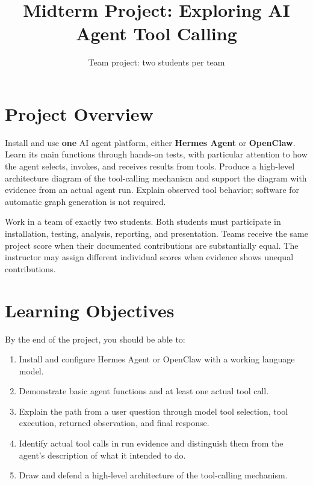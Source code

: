 \documentclass[11pt]{article}
\title{Midterm Project: Exploring AI Agent Tool Calling}
\author{Team project: two students per team}
\date{}
\begin{document}
\maketitle

\section{Project Overview}
Install and use \textbf{one} AI agent platform, either \textbf{Hermes Agent} or \textbf{OpenClaw}. Learn its main functions through hands-on tests, with particular attention to how the agent selects, invokes, and receives results from tools. Produce a high-level architecture diagram of the tool-calling mechanism and support the diagram with evidence from an actual agent run. Explain observed tool behavior; software for automatic graph generation is not required.

Work in a team of exactly two students. Both students must participate in installation, testing, analysis, reporting, and presentation. Teams receive the same project score when their documented contributions are substantially equal. The instructor may assign different individual scores when evidence shows unequal contributions.

\section{Learning Objectives}
By the end of the project, you should be able to:
\begin{enumerate}
  \item Install and configure Hermes Agent or OpenClaw with a working language model.
  \item Demonstrate basic agent functions and at least one actual tool call.
  \item Explain the path from a user question through model tool selection, tool execution, returned observation, and final response.
  \item Identify actual tool calls in run evidence and distinguish them from the agent's description of what it intended to do.
  \item Draw and defend a high-level architecture of the tool-calling mechanism.
\end{enumerate}
\end{document}
